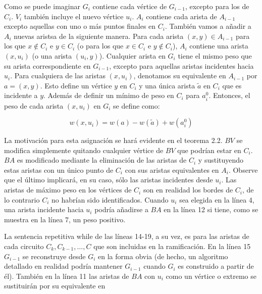 \documentclass[10pt,a5paper]{book}
\begin{document}
Como se puede imaginar $G_i$ contiene cada vértice de $G_{i-1}$, excepto para los de $C_i$. $V_i$ también incluye el nuevo vértice $u_i$. $A_i$ contiene cada arista de $A_{i-1}$ excepto aquellas con uno o más puntos finales en $C_i$. También vamos a añadir a $A_i$ nuevas aristsa de la siguiente manera. Para cada arista $(x,y) \in A_{i-1}$ para los que $x \notin C_i$ e $y \in C_i$ (o para los que $x \in C_i$ e $y \notin C_i$), $A_i$ contiene una arista $(x,u_i)$ (o una arista $(u_i,y)$). Cualquier arista en $G_i$ tiene el mismo peso que su arista correspondiente en $G_{i-1}$, excepto para aquellas aristas incidentes hacia $u_i$. Para cualquiera de las aristas $(x,u_i)$, denotamos su equivalente en $A_{i-1}$ por $a = (x,y)$. Esto define un vértice $y$ en $C_i$ y una única arista $\tilde{a}$ en $C_i$ que es incidente a $y$. Además de definir un mínimo de peso en $C_i$ para $a_i^0$. Entonces, el peso de cada arista $(x,u_i)$ en $G_i$ se define como:

\[ w(x,u_i) = w(a) - w(\tilde{a}) + w(a_i^0) \]

La motivación para esta asignación se hará evidente en el teorema 2.2. $BV$ se modifica simplemente quitando cualquier vértice de $BV$ que podrían estar en $C_i$. $BA$ es modificado mediante la eliminación de las aristas de $C_i$ y sustituyendo estas aristas con un único punto de $C_i$ con sus aristas equivalentes en $A_i$. Observe que el último implicará, en su caso, sólo las aristas incidentes desde $u_i$. Las aristas de máximo peso en los vértices de $C_i$ son en realidad los bordes de $C_i$, de lo contrario $C_i$ no habrían sido identificados. Cuando $u_i$ sea elegida en la línea 4, una arista incidente hacia $u_i$ podría añadirse a $BA$ en la línea 12 si tiene, como se muestra en la línea 7, un peso positivo.

La sentencia repetitiva while de las líneas 14-19, a su vez, es para las aristas de cada circuito $C_k, C_{k-1}, \ldots, C$ que son incluidas en la ramificación. En la línea 15 $G_{i-1}$ se reconstruye desde $G_i$ en la forma obvia (de hecho, un algoritmo detallado en realidad podría mantener $G_{i-1}$ cuando $G_i$ es construido a partir de él). También en la línea 11 las aristas de $BA$ con $u_i$ como un vértice o extremo se sustituirán por su equivalente en 
\end{document}

